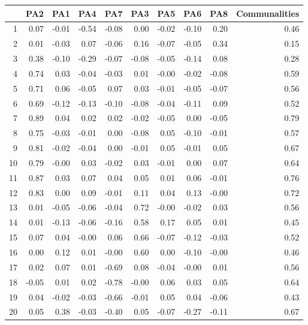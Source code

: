 \documentclass{article}
\begin{document}
\begin{table}[ht]
\centering
\begin{tabular}{rrrrrrrrrr}
  \hline
 & PA2 & PA1 & PA4 & PA7 & PA3 & PA5 & PA6 & PA8 & Communalities \\ 
  \hline
1 & 0.07 & -0.01 & -0.54 & -0.08 & 0.00 & -0.02 & -0.10 & 0.20 & 0.46 \\ 
  2 & 0.01 & -0.03 & 0.07 & -0.06 & 0.16 & -0.07 & -0.05 & 0.34 & 0.15 \\ 
  3 & 0.38 & -0.10 & -0.29 & -0.07 & -0.08 & -0.05 & -0.14 & 0.08 & 0.28 \\ 
  4 & 0.74 & 0.03 & -0.04 & -0.03 & 0.01 & -0.00 & -0.02 & -0.08 & 0.59 \\ 
  5 & 0.71 & 0.06 & -0.05 & 0.07 & 0.03 & -0.01 & -0.05 & -0.07 & 0.56 \\ 
  6 & 0.69 & -0.12 & -0.13 & -0.10 & -0.08 & -0.04 & -0.11 & 0.09 & 0.52 \\ 
  7 & 0.89 & 0.04 & 0.02 & 0.02 & -0.02 & -0.05 & 0.00 & -0.05 & 0.79 \\ 
  8 & 0.75 & -0.03 & -0.01 & 0.00 & -0.08 & 0.05 & -0.10 & -0.01 & 0.57 \\ 
  9 & 0.81 & -0.02 & -0.04 & 0.00 & -0.01 & 0.05 & -0.01 & 0.05 & 0.67 \\ 
  10 & 0.79 & -0.00 & 0.03 & -0.02 & 0.03 & -0.01 & 0.00 & 0.07 & 0.64 \\ 
  11 & 0.87 & 0.03 & 0.07 & 0.04 & 0.05 & 0.01 & 0.06 & -0.01 & 0.76 \\ 
  12 & 0.83 & 0.00 & 0.09 & -0.01 & 0.11 & 0.04 & 0.13 & -0.00 & 0.72 \\ 
  13 & 0.01 & -0.05 & -0.06 & -0.04 & 0.72 & -0.00 & -0.02 & 0.03 & 0.56 \\ 
  14 & 0.01 & -0.13 & -0.06 & -0.16 & 0.58 & 0.17 & 0.05 & 0.01 & 0.45 \\ 
  15 & 0.07 & 0.04 & -0.00 & 0.06 & 0.66 & -0.07 & -0.12 & -0.03 & 0.52 \\ 
  16 & 0.00 & 0.12 & 0.01 & -0.00 & 0.60 & 0.00 & -0.10 & -0.00 & 0.46 \\ 
  17 & 0.02 & 0.07 & 0.01 & -0.69 & 0.08 & -0.04 & -0.00 & 0.01 & 0.56 \\ 
  18 & -0.05 & 0.01 & 0.02 & -0.78 & -0.00 & 0.06 & 0.03 & 0.05 & 0.64 \\ 
  19 & 0.04 & -0.02 & -0.03 & -0.66 & -0.01 & 0.05 & 0.04 & -0.06 & 0.43 \\ 
  20 & 0.05 & 0.38 & -0.03 & -0.40 & 0.05 & -0.07 & -0.27 & -0.11 & 0.67 \\ 

\end{tabular}
\end{table}
\end{document}
